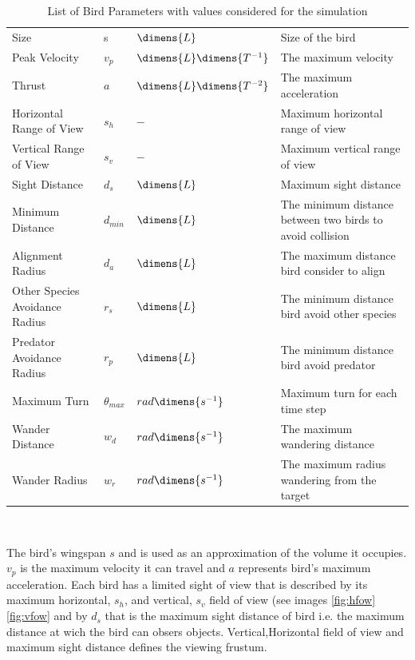 \documentclass[journal,transmag]{IEEEtran}
\begin{document}
\begin{table}
\centering
	\begin{tabular}{|l | l| l| l|}
	\hline
	\tabhead{Name} & \tabhead{Symbol} & \tabhead{Dimension} & \tabhead{Description}\\
	\hline
	Size & s\) & \(\dimens{L}\) & Size of the bird \\
	Peak Velocity & \(v_p\)  & \( \dimens{L} \dimens{T^{-1}}\)  & The maximum velocity\\
	Thrust 	& \(a\) & \( \dimens{L} \dimens{T^{-2}}\)  & The maximum acceleration\\
	Horizontal Range of View & \(s_h\) & \(-\) & Maximum horizontal range of view\\ 
	Vertical Range of View & \(s_v\) 	& \(-\) & Maximum vertical range of view\\
	Sight Distance & \(d_s\) & \( \dimens{L}\) & Maximum sight distance\\
	Minimum Distance & \(d_{min}\) & \( \dimens{L}\)  & The minimum distance between two birds to avoid collision\\
	Alignment Radius & \(d_a\) & \( \dimens{L}\)  & The maximum distance bird consider to align\\
	Other Species Avoidance Radius & \(r_s\) & \( \dimens{L}\) & The minimum distance bird avoid other species\\
	Predator Avoidance Radius & \(r_p\) & \( \dimens{L}\) & The minimum distance bird avoid predator\\
	Maximum Turn & \(\theta_{max}\) & \( rad \dimens{s^{-1}} \) & Maximum turn for each time step\\
	Wander Distance & \(w_d\) & \( rad \dimens{s^{-1}} \) & The maximum wandering distance\\
	Wander Radius & \(w_r\)	& \( rad \dimens{s^{-1}} \) & The maximum radius wandering from the target\\
	\hline
	\end{tabular}
	\hfill \\
	\caption[List of Bird Parameters]{List of Bird Parameters with values considered for the simulation}
	\label{tab:BirdParameters}
\end{table}

The  bird's wingspan \(s\) and is used as an approximation of the volume
it occupies. \(v_p\) is the maximum velocity it can travel and \(a\) represents bird's maximum acceleration.
Each bird has a limited sight of view that is described by its maximum
horizontal, \(s_h\), and vertical, \(s_v\) field of view (see images
\ref{fig:hfow} \ref{fig:vfow} and by \(d_s\) that is the maximum sight distance
of bird i.e. the maximum distance at wich the bird can obsers objects.
Vertical,Horizontal field of view and maximum sight distance defines the viewing 
frustum.
\end{document}
